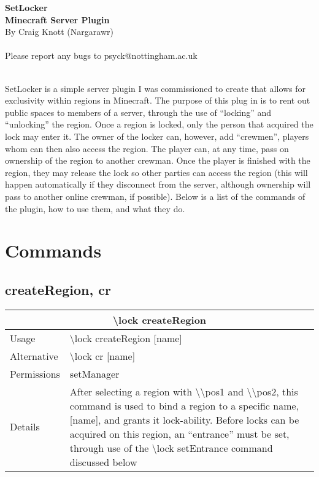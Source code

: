 \documentclass[a4paper,twoside,notitlepage,11pt]{article}
\newcommand{\nin}{\noindent}
\begin{document}
\begin{center}
   \textbf{SetLocker\ \\Minecraft Server Plugin} \ \\
   By Craig Knott (Nargarawr) \ \\
   \ \\
   Please report any bugs to psyck@nottingham.ac.uk
\end{center}
\ \\
\nin
SetLocker is a simple server plugin I was commissioned to create that allows for exclusivity within regions in Minecraft. The purpose of this plug in is to rent out public spaces to members of a server, through the use of ``locking'' and ``unlocking'' the region. Once a region is locked, only the person that acquired the lock may enter it. The owner of the locker can, however, add ``crewmen'', players whom can then also access the region. The player can, at any time, pass on ownership of the region to another crewman. Once the player is finished with the region, they may release the lock so other parties can access the region (this will happen automatically if they disconnect from the server, although ownership will pass to another online crewman, if possible). Below is a list of the commands of the plugin, how to use them, and what they do.

\tableofcontents

\newpage
\pagestyle{plain}

\section{Commands}
\subsection{createRegion, cr}
\begin{center}
\begin{tabular}{|p{2cm}|p{12.5cm}|} \hline
\multicolumn{2}{|c|}{\textbf{\textbackslash lock createRegion}} \\ \hline
Usage       & \textbackslash lock createRegion [name] \\ \hline
Alternative & \textbackslash lock cr [name] \\ \hline
Permissions & setManager \\ \hline
Details 	& After selecting a region with \textbackslash\textbackslash pos1 and \textbackslash\textbackslash pos2, this command is used to bind a region to a specific name, [name], and grants it lock-ability. Before locks can be acquired on this region, an ``entrance'' must be set, through use of the \textbackslash lock setEntrance command discussed below\\ \hline
\end{tabular}
\end{center}
\end{document}
